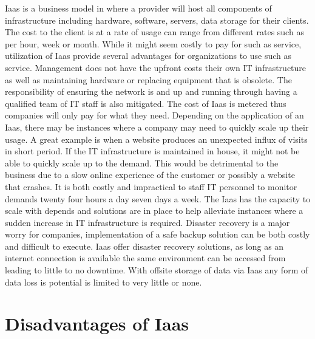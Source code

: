\documentclass[9pt,twocolumn,twoside]{styles/osajnl}
\begin{document}
Iaas is a business model in where a provider will host all components
of infrastructure including hardware, software, servers, data storage
for their clients.  The cost to the client is at a rate of usage can
range from different rates such as per hour, week or month.  While it
might seem costly to pay for such as service, utilization of Iaas
provide several advantages for organizations to use such as service.
Management does not have the upfront costs their own IT infrastructure
as well as maintaining hardware or replacing equipment that is
obsolete.  The responsibility of ensuring the network is and up and
running through having a qualified team of IT staff is also mitigated.
The cost of Iaas is metered thus companies will only pay for what they
need. \cite{www-statetech} Depending on the application of an Iaas, there
may be instances where a company may need to quickly scale up their
usage.  A great example is when a website produces an unexpected
influx of visits in short period.  If the IT infrastructure is
maintained in house, it might not be able to quickly scale up to the
demand.  This would be detrimental to the business due to a slow
online experience of the customer or possibly a website that
crashes. \cite{www-linkedin} It is both costly and impractical to
staff IT personnel to monitor demands twenty four hours a day seven
days a week.  The Iaas has the capacity to scale with depends and
solutions are in place to help alleviate instances where a sudden
increase in IT infrastructure is required.  Disaster recovery is a
major worry for companies, implementation of a safe backup solution
can be both costly and difficult to execute.  Iaas offer disaster
recovery solutions, as long as an internet connection is available the
same environment can be accessed from leading to little to no
downtime.  With offsite storage of data via Iaas any form of data loss
is potential is limited to very little or none. \cite{www-statetech}

\section{Disadvantages of Iaas}
\end{document}
